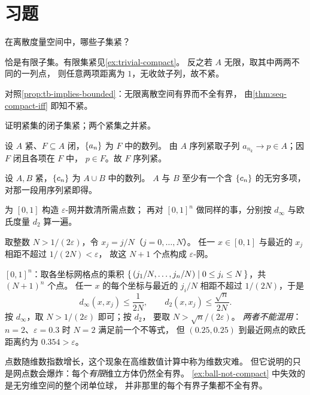 \section*{习题}

\begin{exercise}[例行]
  \label{exr:discrete-compact}
  在离散度量空间中，哪些子集紧？
  \begin{solution}
    恰是有限子集。有限集紧见\cref{ex:trivial-compact}。
    反之若 \(A\) 无限，取其中两两不同的一列点，
    则任意两项距离为 \(1\)，无收敛子列，故不紧。

    对照\cref{prop:tb-implies-bounded}：无限离散空间有界而不全有界，
    由\cref{thm:seq-compact-iff} 即知不紧。
  \end{solution}
\end{exercise}

\begin{exercise}[例行]
  \label{exr:closed-subset-compact}
  证明紧集的闭子集紧；两个紧集之并紧。
  \begin{solution}
    设 \(A\) 紧、\(F \subseteq A\) 闭，\(\{a_{n}\}\) 为 \(F\) 中的数列。
    由 \(A\) 序列紧取子列 \(a_{n_{k}} \to p \in A\)；因 \(F\) 闭且各项在 \(F\) 中，
    \(p \in F\)。故 \(F\) 序列紧。

    设 \(A, B\) 紧，\(\{c_{n}\}\) 为 \(A \cup B\) 中的数列。
    \(A\) 与 \(B\) 至少有一个含 \(\{c_{n}\}\) 的无穷多项，
    对那一段用序列紧即得。
  \end{solution}
\end{exercise}

\begin{exercise}[例行]
  \label{exr:eps-net-count}
  为 \([0,1]\) 构造 \(\varepsilon\)-网并数清所需点数；
  再对 \([0,1]^{n}\) 做同样的事，分别按 \(d_{\infty}\) 与欧氏度量 \(d_{2}\) 算一遍。
  \begin{solution}
    取整数 \(N > 1/(2\varepsilon)\)，令 \(x_{j} = j/N\)（\(j=0,\dots,N\)）。
    任一 \(x \in [0,1]\) 与最近的 \(x_{j}\) 相距不超过 \(1/(2N) < \varepsilon\)，
    故这 \(N+1\) 个点构成 \(\varepsilon\)-网。

    \([0,1]^{n}\)：取各坐标网格点的乘积
    \(\left\{\,(j_{1}/N,\dots,j_{n}/N) \;\middle|\; 0 \le j_{i} \le N\,\right\}\)，共 \((N+1)^{n}\) 个点。
    任一 \(x\) 的每个坐标与最近的 \(j_{i}/N\) 相距不超过 \(1/(2N)\)，于是
    \[
      d_{\infty}(x,x_{j}) \le \frac{1}{2N}, \qquad
      d_{2}(x,x_{j}) \le \frac{\sqrt{n}}{2N} .
    \]
    按 \(d_{\infty}\)，取 \(N>1/(2\varepsilon)\) 即可；按 \(d_{2}\)，
    要取 \(N>\sqrt{n}/(2\varepsilon)\)。
    \emph{两者不能混用}：\(n=2\)、\(\varepsilon=0.3\) 时 \(N=2\) 满足前一个不等式，
    但 \((0.25,0.25)\) 到最近网点的欧氏距离约为 \(0.354>\varepsilon\)。

    点数随维数指数增长，这个现象在高维数值计算中称为维数灾难。
    但它说明的只是网点数会爆炸：每个\emph{有限}维立方体仍然全有界。
    \cref{ex:ball-not-compact} 中失效的是无穷维空间的整个闭单位球，
    并非那里的每个有界子集都不全有界。
  \end{solution}
\end{exercise}

